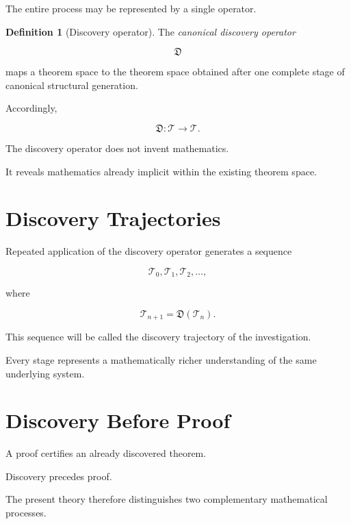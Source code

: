 \documentclass[13pt,openany]{book}
\theoremstyle{plain}
\theoremstyle{definition}
\newtheorem{definition}{Definition}[chapter]
\begin{document}
The entire process may be represented by a single operator.

\begin{definition}[Discovery operator]

The \emph{canonical discovery operator}

\[
\mathfrak D
\]

maps a theorem space to the theorem space obtained after one complete stage of
canonical structural generation.

Accordingly,

\[
\boxed{
\mathfrak D :
\mathcal T
\longrightarrow
\mathcal T.
}
\]

\end{definition}

The discovery operator does not invent mathematics.

It reveals mathematics already implicit within the existing theorem space.

\section{Discovery Trajectories}

Repeated application of the discovery operator generates a sequence

\[
\mathcal T_0,
\mathcal T_1,
\mathcal T_2,
\ldots,
\]

where

\[
\mathcal T_{n+1}
=
\mathfrak D(\mathcal T_n).
\]

This sequence will be called the discovery trajectory of the investigation.

Every stage represents a mathematically richer understanding of the same
underlying system.

\section{Discovery Before Proof}

A proof certifies an already discovered theorem.

Discovery precedes proof.

The present theory therefore distinguishes two complementary mathematical
processes.
\end{document}

